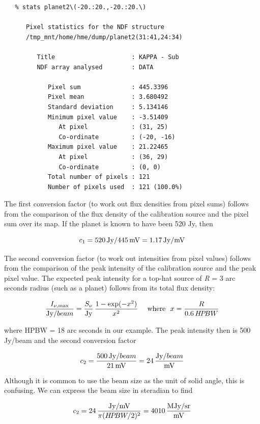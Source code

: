\documentclass[11pt]{article}
\newcommand{\htmlref}[2]{#1}
\begin{document}
\begin{verbatim}
   % stats planet2\(-20.:20.,-20.:20.\)

      Pixel statistics for the NDF structure
      /tmp_mnt/home/hme/dump/planet2(31:41,24:34)

         Title                     : KAPPA - Sub
         NDF array analysed        : DATA

            Pixel sum              : 445.3396
            Pixel mean             : 3.680492
            Standard deviation     : 5.134146
            Minimum pixel value    : -3.51409
               At pixel            : (31, 25)
               Co-ordinate         : (-20, -16)
            Maximum pixel value    : 21.22465
               At pixel            : (36, 29)
               Co-ordinate         : (0, 0)
            Total number of pixels : 121
            Number of pixels used  : 121 (100.0%)
\end{verbatim}

   The first conversion factor (to work out flux densities from pixel
   sums) follows from the comparison of the flux density of the
   calibration source and the pixel sum over its map. If the planet is
   known to have been 520 Jy, then

\[c_1 = 520\,{\rm Jy} / 445\,{\rm mV} = 1.17\,{\rm Jy/mV}\]

   The second conversion factor (to work out intensities from pixel
   values) follows from the comparison of the peak intensity of the
   calibration source and the peak pixel value. The expected peak
   intensity for a top-hat source of {\it R\/} = 3 arc seconds radius
   (such as a planet) follows from its total flux density:

\[{I_{\nu,\rm max} \over {\rm Jy}/beam}
    = {S_{\nu} \over {\rm Jy}}
    \, {1 - \exp(-x^2) \over x^2}
\mbox{\ \ \ \ where\ \ }
  x = {R \over 0.6\,H\!P\!BW}\]

   where
\htmlref{HPBW}{glosshpbw}
   = 18 arc seconds in our example. The peak intensity then is 500
   Jy/beam and the second conversion factor

\[c_2 = {500\,{\rm Jy}/beam \over 21\,{\rm mV}}
      =  24\,{{\rm Jy}/beam \over     {\rm mV}}\]

   Although it is common to use the beam size as the unit of solid
   angle, this is confusing. We can express the beam size in steradian
   to find

\[c_2 =  24\,{{\rm Jy/mV} \over \pi (H\!P\!BW/2)^2}
      = 4010\,{\rm MJy/sr \over mV}\]
\end{document}
